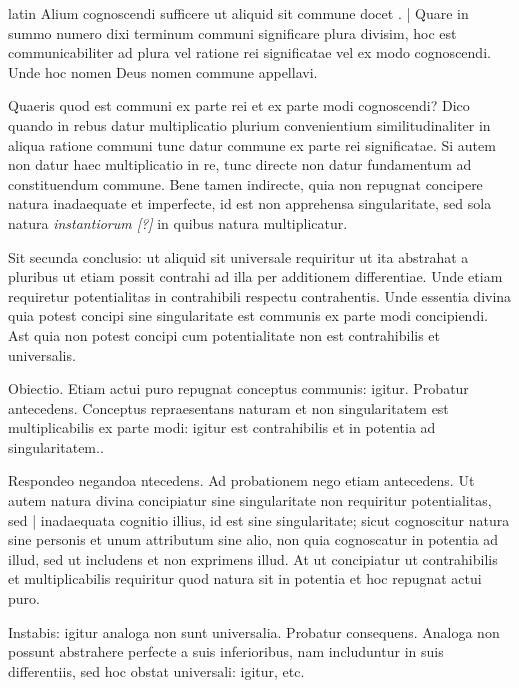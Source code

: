 \begin{otherlanguage*}{latin}
\pstart
  Alium cognoscendi sufficere ut aliquid sit commune docet . \textnormal{|} Quare in summo numero dixi terminum communi significare plura divisim, hoc est communicabiliter ad plura vel ratione rei significatae vel ex modo cognoscendi. Unde hoc nomen Deus nomen commune appellavi. 
\pend

\pstart
  Quaeris quod est communi ex parte rei et ex parte modi cognoscendi? Dico quando in rebus datur multiplicatio plurium convenientium similitudinaliter in aliqua ratione communi tunc datur commune ex parte rei significatae. Si autem non datur haec multiplicatio in re, tunc directe non datur fundamentum ad constituendum commune. Bene tamen indirecte, quia non repugnat concipere natura inadaequate et imperfecte, id est non apprehensa singularitate, sed sola natura \emph{instantiorum [?]} in quibus natura multiplicatur. 
\pend

\pstart
  Sit secunda conclusio: ut aliquid sit universale requiritur ut ita abstrahat a pluribus ut etiam possit contrahi ad illa per additionem differentiae. Unde etiam requiretur potentialitas in contrahibili respectu contrahentis. Unde essentia divina quia potest concipi sine singularitate est communis ex parte modi concipiendi. Ast quia non potest concipi cum potentialitate non est contrahibilis et universalis. 
\pend

\pstart
  Obiectio. Etiam actui puro repugnat conceptus communis: igitur. Probatur antecedens. Conceptus repraesentans naturam et non singularitatem est multiplicabilis ex parte modi: igitur est contrahibilis et in potentia ad singularitatem.. 
\pend

\pstart
  Respondeo negandoa ntecedens. Ad probationem nego etiam antecedens. Ut autem natura divina concipiatur sine singularitate non requiritur potentialitas, sed \textnormal{|}   inadaequata cognitio illius, id est sine singularitate; sicut cognoscitur natura sine personis et unum attributum sine alio, non quia cognoscatur in potentia ad illud, sed ut includens et non exprimens illud. At ut concipiatur ut contrahibilis et multiplicabilis requiritur quod natura sit in potentia et hoc repugnat actui puro. 
\pend

\pstart
  Instabis: igitur analoga non sunt universalia. Probatur consequens. Analoga non possunt abstrahere perfecte a suis inferioribus, nam includuntur in suis differentiis, sed hoc obstat universali: igitur, etc. 
\pend


\end{otherlanguage*}
